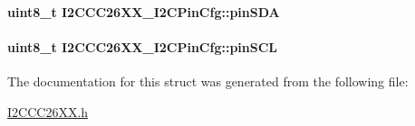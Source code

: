 \paragraph[{pin\-S\-D\-A}]{\setlength{\rightskip}{0pt plus 5cm}uint8\-\_\-t I2\-C\-C\-C26\-X\-X\-\_\-\-I2\-C\-Pin\-Cfg\-::pin\-S\-D\-A}\label{struct_i2_c_c_c26_x_x___i2_c_pin_cfg_a07155d4bf6fac9ed7181eca65563e2c9}
\paragraph[{pin\-S\-C\-L}]{\setlength{\rightskip}{0pt plus 5cm}uint8\-\_\-t I2\-C\-C\-C26\-X\-X\-\_\-\-I2\-C\-Pin\-Cfg\-::pin\-S\-C\-L}\label{struct_i2_c_c_c26_x_x___i2_c_pin_cfg_af6a6d421ac74746b80065a3e9de338d6}


The documentation for this struct was generated from the following file\-:\begin{DoxyCompactItemize}
\item 
\hyperlink{_i2_c_c_c26_x_x_8h}{I2\-C\-C\-C26\-X\-X.\-h}\end{DoxyCompactItemize}
